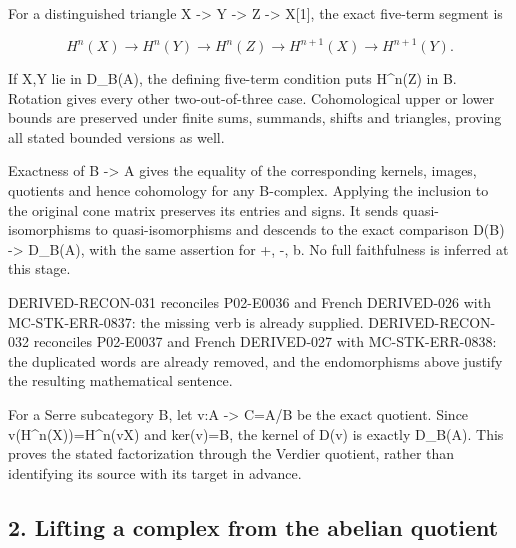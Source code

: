 For a distinguished triangle X \allowbreak{}-> Y \allowbreak{}-> Z \allowbreak{}-> X[1]\allowbreak{},\allowbreak{} the exact five-term segment is

\[
 H^n(X)\longrightarrow H^n(Y)\longrightarrow H^n(Z)
       \longrightarrow H^{n+1}(X)\longrightarrow H^{n+1}(Y).
\]

If X,\allowbreak{}Y lie in D\_\allowbreak{}B(A)\allowbreak{},\allowbreak{} the defining five-term condition puts H\textasciicircum{}n(Z)\allowbreak{} in B. Rotation gives every other two-out-of-three case. Cohomological upper or lower bounds are preserved under finite sums,\allowbreak{} summands,\allowbreak{} shifts and triangles,\allowbreak{} proving all stated bounded versions as well.

Exactness of B \allowbreak{}-> A gives the equality of the corresponding kernels,\allowbreak{} images,\allowbreak{} quotients and hence cohomology for any B-complex. Applying the inclusion to the original cone matrix preserves its entries and signs. It sends quasi-isomorphisms to quasi-isomorphisms and descends to the exact comparison D(B)\allowbreak{} \allowbreak{}-> D\_\allowbreak{}B(A)\allowbreak{},\allowbreak{} with the same assertion for \allowbreak{}+,\allowbreak{} -,\allowbreak{} b. No full faithfulness is inferred at this stage.

DERIVED-RECON-031 reconciles P02-E0036 and French DERIVED-026 with MC-STK-ERR-0837:\allowbreak{} the missing verb is already supplied. DERIVED-RECON-032 reconciles P02-E0037 and French DERIVED-027 with MC-STK-ERR-0838:\allowbreak{} the duplicated words are already removed,\allowbreak{} and the endomorphisms above justify the resulting mathematical sentence.

For a Serre subcategory B,\allowbreak{} let v:\allowbreak{}A \allowbreak{}-> C\allowbreak{}=A/\allowbreak{}B be the exact quotient. Since v(H\textasciicircum{}n(X)\allowbreak{})\allowbreak{}\allowbreak{}=H\textasciicircum{}n(vX)\allowbreak{} and ker(v)\allowbreak{}\allowbreak{}=B,\allowbreak{} the kernel of D(v)\allowbreak{} is exactly D\_\allowbreak{}B(A)\allowbreak{}. This proves the stated factorization through the Verdier quotient,\allowbreak{} rather than identifying its source with its target in advance.

\subsection{2. Lifting a complex from the abelian quotient}\label{proofs-5910-6199-lifting-a-complex-from-the-abelian-quotient}


